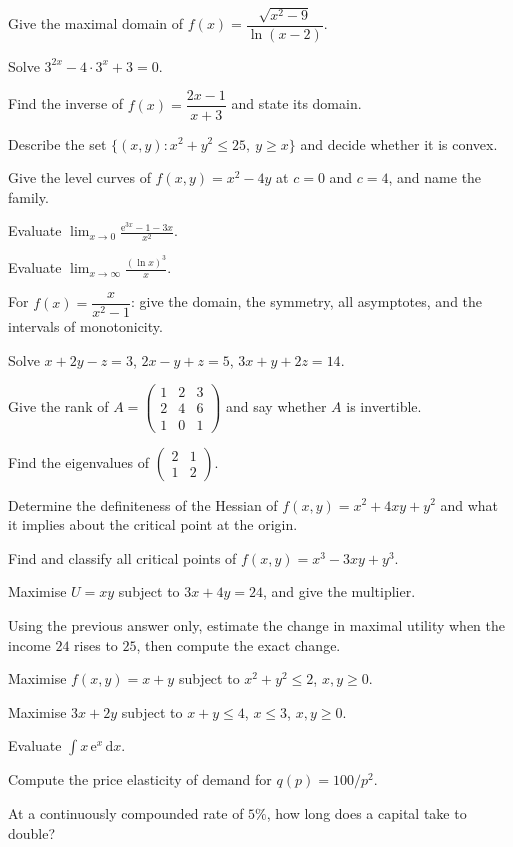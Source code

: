 \begin{problems}
  \item Give the maximal domain of
        $f(x)=\dfrac{\sqrt{x^{2}-9}}{\ln(x-2)}$.
  \item Solve $3^{2x}-4\cdot3^{x}+3=0$.
  \item Find the inverse of $f(x)=\dfrac{2x-1}{x+3}$ and state its domain.
  \item Describe the set $\{(x,y): x^{2}+y^{2}\le25,\ y\ge x\}$ and decide
        whether it is convex.
  \item Give the level curves of $f(x,y)=x^{2}-4y$ at $c=0$ and $c=4$, and
        name the family.
  \item Evaluate $\displaystyle\lim_{x\to0}
        \frac{\mathrm{e}^{3x}-1-3x}{x^{2}}$.
  \item Evaluate $\displaystyle\lim_{x\to\infty}\frac{(\ln x)^{3}}{x}$.
  \item For $f(x)=\dfrac{x}{x^{2}-1}$: give the domain, the symmetry, all
        asymptotes, and the intervals of monotonicity.
  \item Solve $x+2y-z=3$, \;$2x-y+z=5$, \;$3x+y+2z=14$.
  \item Give the rank of
        $A=\begin{pmatrix}1&2&3\\2&4&6\\1&0&1\end{pmatrix}$ and say whether
        $A$ is invertible.
  \item Find the eigenvalues of
        $\begin{pmatrix}2&1\\1&2\end{pmatrix}$.
  \item Determine the definiteness of the Hessian of
        $f(x,y)=x^{2}+4xy+y^{2}$ and what it implies about the critical
        point at the origin.
  \item Find and classify all critical points of
        $f(x,y)=x^{3}-3xy+y^{3}$.
  \item Maximise $U=xy$ subject to $3x+4y=24$, and give the multiplier.
  \item Using the previous answer only, estimate the change in maximal
        utility when the income $24$ rises to $25$, then compute the exact
        change.
  \item Maximise $f(x,y)=x+y$ subject to $x^{2}+y^{2}\le2$, $x,y\ge0$.
  \item Maximise $3x+2y$ subject to $x+y\le4$, $x\le3$, $x,y\ge0$.
  \item Evaluate $\displaystyle\int x\,\mathrm{e}^{x}\,\mathrm{d}x$.
  \item Compute the price elasticity of demand for $q(p)=100/p^{2}$.
  \item At a continuously compounded rate of $5\%$, how long does a
        capital take to double?
\end{problems}

